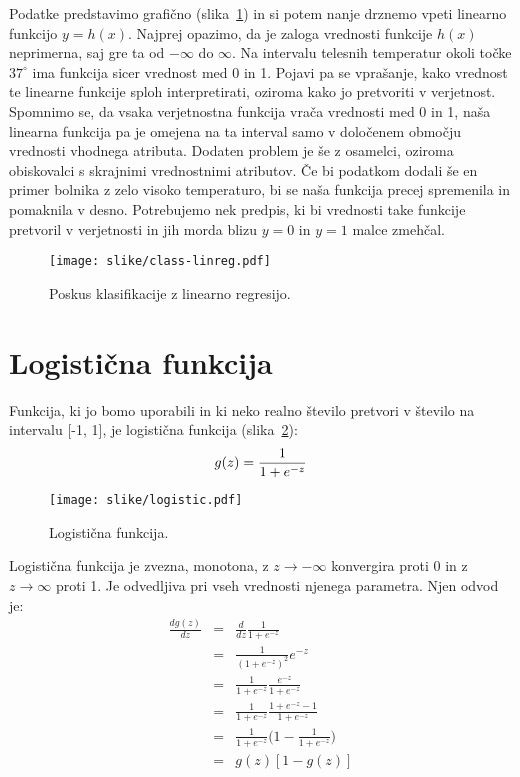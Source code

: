 Podatke predstavimo grafično (slika~\ref{f:class-linreg}) in si potem nanje drznemo vpeti linearno funkcijo $y=h(x)$. Najprej opazimo, da je zaloga vrednosti funkcije $h(x)$ neprimerna, saj gre ta od $-\infty$ do $\infty$. Na intervalu telesnih temperatur okoli točke $37^{\circ}$ ima funkcija sicer vrednost med 0 in 1. Pojavi pa se vprašanje, kako vrednost te linearne funkcije sploh interpretirati, oziroma kako jo pretvoriti v verjetnost. Spomnimo se, da vsaka verjetnostna funkcija vrača vrednosti med 0 in 1, naša linearna funkcija pa je omejena na ta interval samo v določenem območju vrednosti vhodnega atributa. Dodaten problem je še z osamelci, oziroma obiskovalci s skrajnimi vrednostnimi atributov. Če bi podatkom dodali še en primer bolnika z zelo visoko temperaturo, bi se naša funkcija precej spremenila in pomaknila v desno. Potrebujemo nek predpis, ki bi vrednosti take funkcije pretvoril v verjetnosti in jih morda blizu $y=0$ in $y=1$ malce zmehčal.

\begin{figure}[htbp]
\begin{center}
\texttt{[image: slike/class-linreg.pdf]}
\caption{Poskus klasifikacije z linearno regresijo.}
\label{f:class-linreg}
\end{center}
\end{figure}

\section{Logistična funkcija}

Funkcija, ki jo bomo uporabili in ki neko realno število pretvori v število na intervalu [-1, 1], je logistična funkcija (slika~\ref{f:logistic-function}):
\begin{equation}
  g(z) = {1\over 1+e^{-z}}
\end{equation}

\begin{figure}[htbp]
\begin{center}
\texttt{[image: slike/logistic.pdf]}
\caption{Logistična funkcija.}
\label{f:logistic-function}
\end{center}
\end{figure}

Logistična funkcija je zvezna, monotona, z $z\to -\infty$ konvergira proti 0 in z $z\to\infty$ proti 1. Je odvedljiva pri vseh vrednosti njenega parametra. Njen odvod je:
\begin{eqnarray}
  \frac{dg(z)}{dz} & = & \frac{d}{dz} \frac{1}{1+e^{-z}} \nonumber \\
  & = & \frac{1}{(1+e^{-z})^2} e^{-z} \nonumber \\
  & = & \frac{1}{1+e^{-z}}\frac{e^{-z}}{1+e^{-z}} \nonumber \\
  & = & \frac{1}{1+e^{-z}}\frac{1+e^{-z}-1}{1+e^{-z}} \nonumber \\
  & = & \frac{1}{1+e^{-z}}\big(1-\frac{1}{1+e^{-z}}\big) \nonumber \\
  & = & g(z)[1-g(z)]
\end{eqnarray}

